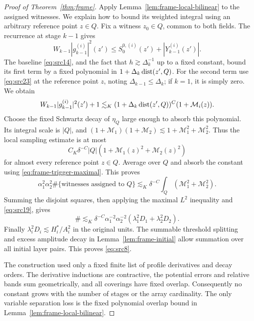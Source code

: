 \begin{proof}[Proof of Theorem~\ref{thm:frame}]
Apply Lemma~\ref{lem:frame-local-bilinear} to the assigned witnesses.
We explain how to bound its weighted integral using an arbitrary
reference point $z\in Q$.  Fix a witness $z_0\in Q$, common to both
fields.  The recurrence at stage $k-1$ gives
\[
 W_{k-1}|g_{k-1}^{(i)}|^2(z')
 \leq S_0^{0,(i)}(z')+|Y_{k-1}^{(i)}(z')|.
\]
The baseline \eqref{eq:src14}, and the fact that
$h\gtrsim\Delta_k^{-1}$ up to a fixed constant, bound its first
term by a fixed polynomial in
$1+\Delta_k\operatorname{dist}(z',Q)$.
For the second term use \eqref{eq:src23} at the reference point
$z$, noting $\Delta_{k-1}\leq\Delta_k$; if $k=1$, it is simply
zero.  We obtain
\[
 W_{k-1}|g_{k-1}^{(i)}|^2(z')+1
 \lesssim_K(1+\Delta_k\operatorname{dist}(z',Q))^{C}
                         (1+\mathcal M_i(z)).
\]
Choose the fixed Schwartz decay of $\eta_Q$ large enough to absorb
this polynomial.  Its integral scale is $|Q|$, and
$(1+\mathcal M_1)(1+\mathcal M_2)\lesssim
1+\mathcal M_1^2+\mathcal M_2^2$.  Thus the local sampling estimate
is at most
\[
 C_K\delta^{-C}|Q|
            (1+\mathcal M_1(z)^2+\mathcal M_2(z)^2)
\]
for almost every reference point $z\in Q$.  Average over $Q$ and
absorb the constant using \eqref{eq:frame-trigger-maximal}.  This proves
\[
 \alpha_1^2\alpha_2^2
 \#\{\text{witnesses assigned to }Q\}
 \lesssim_K\delta^{-C}\int_Q(\mathcal M_1^2+\mathcal M_2^2).
\]
Summing the disjoint squares, then applying the maximal $L^2$
inequality and \eqref{eq:src19}, gives
\[
 \#\lesssim_K\delta^{-C}\alpha_1^{-2}\alpha_2^{-2}
                  (\lambda_1^2D_1+\lambda_2^2D_2).
\]
Finally
$\lambda_i^2D_i\lesssim H_i^*/A_i^2$ in the original units.
The summable threshold splitting and excess amplitude decay in
Lemma~\ref{lem:frame-initial} allow summation over all initial layer
pairs.  This proves \eqref{eq:src8}.

The construction used only a fixed finite list of profile derivatives
and decay orders.  The derivative inductions are contractive, the
potential errors and relative bands sum geometrically, and all
coverings have fixed overlap.  Consequently no constant grows with
the number of stages or the array cardinality.  The only variable
separation loss is the fixed polynomial overlap bound in
Lemma~\ref{lem:frame-local-bilinear}.
\end{proof}

